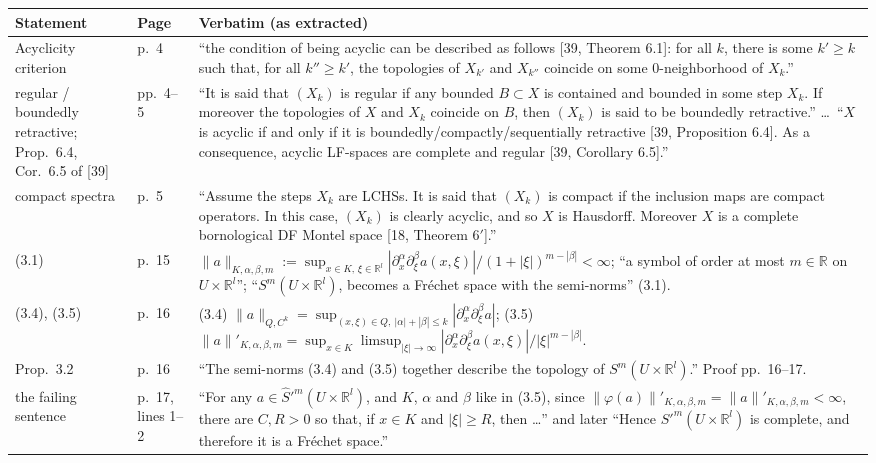 \documentclass[11pt]{article}
\newcommand{\R}{\mathbb{R}}
\begin{document}
{\footnotesize
\begin{longtable}{@{}p{}p{}p{}@{}}
\hline
\textbf{Statement} & \textbf{Page} & \textbf{Verbatim (as extracted)}\\
\hline
\endhead
Acyclicity criterion & p.~4 & ``the condition of being acyclic can be described as follows [39, Theorem 6.1]: for all $k$, there is some $k'\ge k$ such that, for all $k''\ge k'$, the topologies of $X_{k'}$ and $X_{k''}$ coincide on some 0-neighborhood of $X_k$.''\\
regular / boundedly retractive; Prop.~6.4, Cor.~6.5 of [39] & pp.~4--5 & ``It is said that $(X_k)$ is regular if any bounded $B\subset X$ is contained and bounded in some step $X_k$. If moreover the topologies of $X$ and $X_k$ coincide on $B$, then $(X_k)$ is said to be boundedly retractive.'' \dots\ ``$X$ is acyclic if and only if it is boundedly/compactly/sequentially retractive [39, Proposition 6.4]. As a consequence, acyclic LF-spaces are complete and regular [39, Corollary 6.5].''\\
compact spectra & p.~5 & ``Assume the steps $X_k$ are LCHSs. It is said that $(X_k)$ is compact if the inclusion maps are compact operators. In this case, $(X_k)$ is clearly acyclic, and so $X$ is Hausdorff. Moreover $X$ is a complete bornological DF Montel space [18, Theorem 6$'$].''\\
(3.1) & p.~15 & $\|a\|_{K,\alpha,\beta,m}:=\sup_{x\in K,\,\xi\in\R^l}|\partial^\alpha_x\partial^\beta_\xi a(x,\xi)|/(1+|\xi|)^{m-|\beta|}<\infty$; ``a symbol of order at most $m\in\R$ on $U\times\R^l$''; ``$S^m(U\times\R^l)$, becomes a Fr\'echet space with the semi-norms'' (3.1).\\
(3.4), (3.5) & p.~16 & (3.4) $\|a\|_{Q,C^k}=\sup_{(x,\xi)\in Q,\ |\alpha|+|\beta|\le k}|\partial^\alpha_x\partial^\beta_\xi a|$; (3.5) $\|a\|'_{K,\alpha,\beta,m}=\sup_{x\in K}\limsup_{|\xi|\to\infty}|\partial^\alpha_x\partial^\beta_\xi a(x,\xi)|/|\xi|^{m-|\beta|}$.\\
Prop.~3.2 & p.~16 & ``The semi-norms (3.4) and (3.5) together describe the topology of $S^m(U\times\R^l)$.'' Proof pp.~16--17.\\
the failing sentence & p.~17, lines 1--2 & ``For any $a\in\hat S'^m(U\times\R^l)$, and $K$, $\alpha$ and $\beta$ like in (3.5), since $\|\varphi(a)\|'_{K,\alpha,\beta,m}=\|a\|'_{K,\alpha,\beta,m}<\infty$, there are $C,R>0$ so that, if $x\in K$ and $|\xi|\ge R$, then \dots'' and later ``Hence $S'^m(U\times\R^l)$ is complete, and therefore it is a Fr\'echet space.''\\

\end{longtable}}
\end{document}
